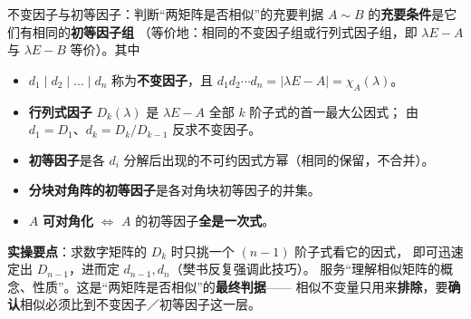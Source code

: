 \begin{fdeep}{不变因子与初等因子：判断“两矩阵是否相似”的充要判据}
$A\sim B$ 的\textbf{充要条件}是它们有相同的\textbf{初等因子组}
（等价地：相同的不变因子组或行列式因子组，即 $\lambda E-A$ 与 $\lambda E-B$ 等价）。其中
\begin{itemize}[leftmargin=1.8em,itemsep=0.15em]
\item $d_1\mid d_2\mid\dots\mid d_n$ 称为\textbf{不变因子}，且
      $d_1d_2\cdots d_n=\lvert\lambda E-A\rvert=\chi_A(\lambda)$。
\item \textbf{行列式因子} $D_k(\lambda)$ 是 $\lambda E-A$ 全部 $k$ 阶子式的首一最大公因式；
      由 $d_1=D_1$、$d_k=D_k/D_{k-1}$ 反求不变因子。
\item \textbf{初等因子}是各 $d_i$ 分解后出现的不可约因式方幂（相同的保留，不合并）。
\item \textbf{分块对角阵的初等因子}是各对角块初等因子的并集。
\item $A$ \textbf{可对角化} $\iff$ $A$ 的初等因子\textbf{全是一次式}。
\end{itemize}
\textbf{实操要点}：求数字矩阵的 $D_k$ 时只挑一个 $(n-1)$ 阶子式看它的因式，
即可迅速定出 $D_{n-1}$，进而定 $d_{n-1},d_n$（樊书反复强调此技巧）。
\fbref{}服务“理解相似矩阵的概念、性质”。这是“两矩阵是否相似”的\textbf{最终判据}——
相似不变量只用来\textbf{排除}，要\textbf{确认}相似必须比到不变因子／初等因子这一层。
\end{fdeep}

